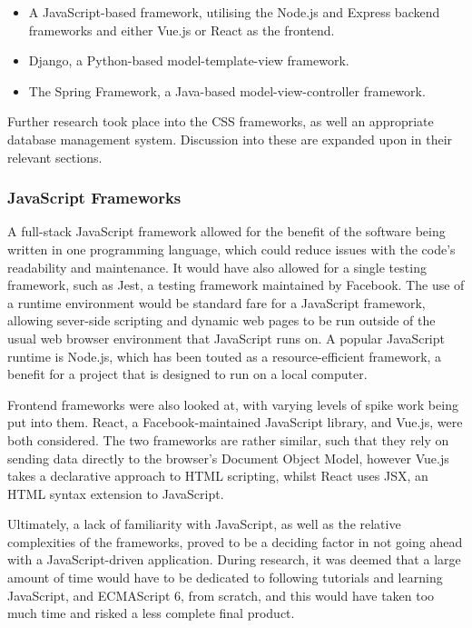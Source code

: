 \begin{itemize}
\item	A JavaScript-based framework, utilising the Node.js and Express backend frameworks and either Vue.js or React as the frontend.
\item	Django, a Python-based model-template-view framework.
\item	The Spring Framework, a Java-based model-view-controller framework.
\end{itemize}

Further research took place into the CSS frameworks, as well an appropriate database management system. Discussion into these are expanded upon in their relevant sections.

\subsubsection{JavaScript Frameworks}

A full-stack JavaScript framework allowed for the benefit of the software being written in one programming language, which could reduce issues with the code's readability and maintenance. It would have also allowed for a single testing framework, such as Jest, a testing framework maintained by Facebook.
The use of a runtime environment would be standard fare for a JavaScript framework, allowing sever-side scripting and dynamic web pages to be run outside of the usual web browser environment that JavaScript runs on. A popular JavaScript runtime is Node.js, which has been touted as a resource-efficient framework, a benefit for a project that is designed to run on a local computer.


Frontend frameworks were also looked at, with varying levels of spike work being put into them. React, a Facebook-maintained JavaScript library, and Vue.js, were both considered. The two frameworks are rather similar, such that they rely on sending data directly to the browser's Document Object Model, however Vue.js takes a declarative approach to HTML scripting, whilst React uses JSX, an HTML syntax extension to JavaScript.


Ultimately, a lack of familiarity with JavaScript, as well as the relative complexities of the frameworks, proved to be a deciding factor in not going ahead with a JavaScript-driven application. During research, it was deemed that a large amount of time would have to be dedicated to following tutorials and learning JavaScript, and ECMAScript 6, from scratch, and this would have taken too much time and risked a less complete final product.

